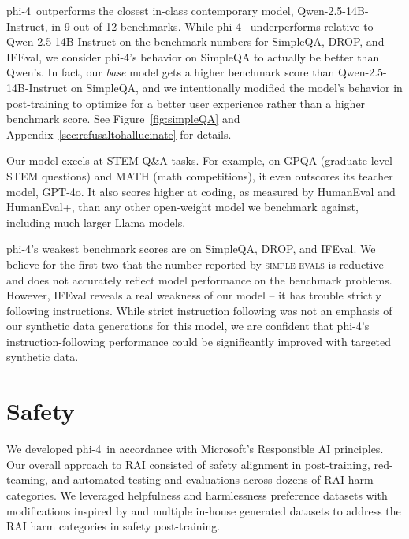 \documentclass[11pt]{article}
\newcommand{\modelwithoutspace}{\textsf{phi-4}}
\newcommand{\model}{\modelwithoutspace~}
\begin{document}
\model outperforms the closest in-class contemporary model, Qwen-2.5-14B-Instruct, in 9 out of 12 benchmarks.  While \model 
underperforms relative to Qwen-2.5-14B-Instruct on the benchmark numbers for SimpleQA, DROP, and IFEval, we consider \modelwithoutspace's behavior on SimpleQA to actually be better than Qwen's.  In fact, our \emph{base} model gets a higher benchmark score than Qwen-2.5-14B-Instruct on SimpleQA, and we intentionally modified the model's behavior in post-training to optimize for a better user experience rather than a higher benchmark score.  See Figure~\ref{fig:simpleQA} and Appendix~\ref{sec:refusaltohallucinate} for details.

Our model excels at STEM Q\&A tasks.  For example, on GPQA (graduate-level STEM questions) and MATH (math competitions), it even outscores its teacher model, GPT-4o.  It also scores higher at coding, as measured by HumanEval and HumanEval+, than any other open-weight model we benchmark against, including much larger Llama models.

\modelwithoutspace's weakest benchmark scores are on SimpleQA, DROP, and IFEval.
We believe for the first two that the number reported by \textsc{simple-evals} is reductive and does not accurately reflect model performance on the benchmark problems.
However, IFEval reveals a real weakness of our model -- it has trouble strictly following instructions. While strict instruction following was not an emphasis of our synthetic data generations for this model, we are confident that \modelwithoutspace's instruction-following performance could be significantly improved with targeted synthetic data.



\section{Safety}

We developed \model in accordance with Microsoft’s Responsible AI principles. Our overall approach to RAI consisted of safety alignment in post-training, red-teaming, and automated testing and evaluations across dozens of RAI harm categories. We leveraged helpfulness and harmlessness preference datasets \cite{bai2022training, ji2023beavertails} with modifications inspired by \cite{bianchi2024safetytuned} and multiple in-house generated datasets to address the RAI harm categories in safety post-training. 
\end{document}
